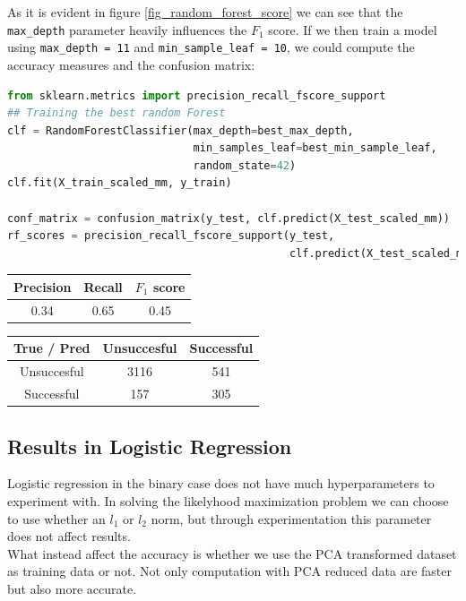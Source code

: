 As it is evident in figure \ref{fig_random_forest_score} we can see that the \texttt{max\_depth} parameter heavily influences the \(F_1\) score. If we then train a model using \texttt{max\_depth = 11} and \texttt{min\_sample\_leaf = 10}, we could compute the accuracy measures and the confusion matrix:

\begin{lstlisting}[language=Python, caption= Deploying the Random forest with the best parameters]
from sklearn.metrics import precision_recall_fscore_support
## Training the best random Forest
clf = RandomForestClassifier(max_depth=best_max_depth,
                             min_samples_leaf=best_min_sample_leaf, 
                             random_state=42)
clf.fit(X_train_scaled_mm, y_train)

conf_matrix = confusion_matrix(y_test, clf.predict(X_test_scaled_mm))
rf_scores = precision_recall_fscore_support(y_test,
                                            clf.predict(X_test_scaled_mm))
\end{lstlisting}
\begin{center}
    \begin{tabular}{|c|c|c|}
        \hline
        Precision & Recall & \(F_1\) score \\
        \hline
        0.34 & 0.65 & 0.45 \\
        \hline
    \end{tabular}
    \quad     
    \begin{tabular}{|c|c|c|}
        \hline
         True / Pred & Unsuccesful & Successful \\
        \hline
        Unsuccesful & 3116 & 541 \\
        \hline
        Successful & 157 & 305\\
        \hline
    \end{tabular}
\end{center}
\subsection{Results in Logistic Regression}
Logistic regression in the binary case does not have much hyperparameters to experiment with. In solving the likelyhood maximization problem we can choose to use whether an \(l_1\) or \(l_2\) norm, but through experimentation this parameter does not affect results. \\
What instead affect the accuracy is whether we use the PCA transformed dataset as training data or not. Not only computation with PCA reduced data are faster but also more accurate. 


